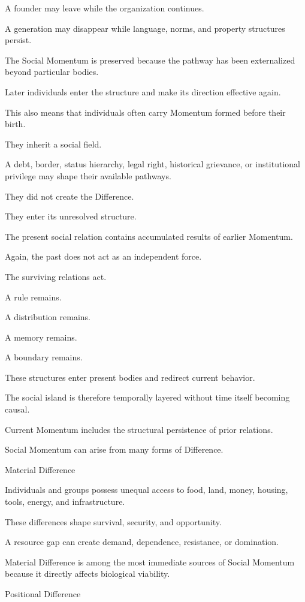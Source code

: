 A founder may leave while the organization continues.

A generation may disappear while language, norms, and property structures persist.

The Social Momentum is preserved because the pathway has been externalized beyond particular bodies.

Later individuals enter the structure and make its direction effective again.

This also means that individuals often carry Momentum formed before their birth.

They inherit a social field.

A debt, border, status hierarchy, legal right, historical grievance, or institutional privilege may shape their available pathways.

They did not create the Difference.

They enter its unresolved structure.

The present social relation contains accumulated results of earlier Momentum.

Again, the past does not act as an independent force.

The surviving relations act.

A rule remains.

A distribution remains.

A memory remains.

A boundary remains.

These structures enter present bodies and redirect current behavior.

The social island is therefore temporally layered without time itself becoming causal.

Current Momentum includes the structural persistence of prior relations.

Social Momentum can arise from many forms of Difference.

Material Difference

Individuals and groups possess unequal access to food, land, money, housing, tools, energy, and infrastructure.

These differences shape survival, security, and opportunity.

A resource gap can create demand, dependence, resistance, or domination.

Material Difference is among the most immediate sources of Social Momentum because it directly affects biological viability.

Positional Difference

